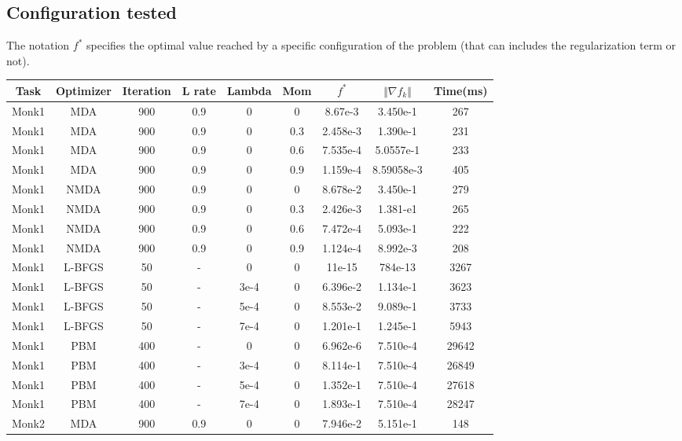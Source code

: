 \subsection{Configuration tested}
The notation $f^*$ specifies the optimal value reached by a specific configuration of the problem (that can includes the regularization term or not). 


\begin{center}
	\small\addtolength{\tabcolsep}{-3pt}
		\centering
		\begin{longtable}{|c|c|c|c|c|c|c|c|c|}
			\hline
			\textbf{Task}& \textbf{Optimizer}&\textbf{Iteration} & \textbf{L rate} & \multicolumn{1}{l|}{\textbf{Lambda}} & \textbf{Mom} & \textbf{$f^{*}$}& \textbf{$\Vert \nabla f_{k}\Vert$ }& \textbf{Time(ms)}\\ \hline 
			Monk1 & MDA & 900 & 0.9 & 0  & 0 & 8.67e-3 & 3.450e-1 & 267 \\
			Monk1 & MDA & 900 & 0.9 & 0  & 0.3 & 2.458e-3 & 1.390e-1 & 231 \\
			Monk1 & MDA & 900 & 0.9 & 0  & 0.6 & 7.535e-4 & 5.0557e-1 & 233 \\
			Monk1 & MDA & 900 & 0.9 & 0  & 0.9 & 1.159e-4 & 8.59058e-3 & 405 \\
			Monk1 & NMDA & 900 & 0.9 & 0  & 0 & 8.678e-2 & 3.450e-1 & 279 \\
			Monk1 & NMDA & 900 & 0.9 & 0  & 0.3 & 2.426e-3 & 1.381-e1 & 265 \\
			Monk1 & NMDA & 900 & 0.9 & 0  & 0.6 & 7.472e-4 & 5.093e-1 & 222 \\
			Monk1 & NMDA & 900 & 0.9 & 0  & 0.9 & 1.124e-4 & 8.992e-3 & 208 \\
			Monk1 & L-BFGS & 50 & - & 0  & 0 & 11e-15 & 784e-13 & 3267 \\
			Monk1 & L-BFGS & 50 & - & 3e-4  & 0 & 6.396e-2 & 1.134e-1 & 3623 \\
			Monk1 & L-BFGS & 50 & - & 5e-4  & 0 & 8.553e-2 & 9.089e-1 & 3733 \\
			Monk1 & L-BFGS & 50 & - & 7e-4  & 0 & 1.201e-1 & 1.245e-1 & 5943 \\
			Monk1 & PBM & 400 & - & 0  & 0 & 6.962e-6 & 7.510e-4 & 29642 \\
			Monk1 & PBM & 400 & - & 3e-4  & 0 & 8.114e-1 & 7.510e-4 & 26849 \\
			Monk1 & PBM & 400 & - & 5e-4  & 0 & 1.352e-1 & 7.510e-4 & 27618 \\
			Monk1 & PBM & 400 & - & 7e-4  & 0 & 1.893e-1 & 7.510e-4 & 28247 \\
			Monk2 & MDA & 900 & 0.9 & 0  & 0 & 7.946e-2 & 5.151e-1 & 148\\

\end{longtable}
\end{center}
